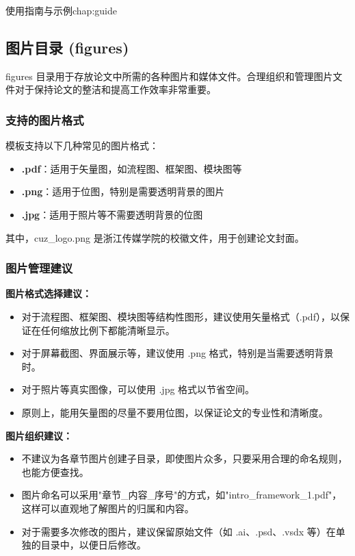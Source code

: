 \begin{cuzchapter}{使用指南与示例}{chap:guide}
    \subsection{图片目录 (figures)}\label{sub:figures}

    figures 目录用于存放论文中所需的各种图片和媒体文件。合理组织和管理图片文件对于保持论文的整洁和提高工作效率非常重要。

    \subsubsection{支持的图片格式}\label{subsub:image-formats}

    模板支持以下几种常见的图片格式：
    \begin{itemize}
        \item \textbf{.pdf}：适用于矢量图，如流程图、框架图、模块图等
        \item \textbf{.png}：适用于位图，特别是需要透明背景的图片
        \item \textbf{.jpg}：适用于照片等不需要透明背景的位图
    \end{itemize}

    其中，cuz\_logo.png 是浙江传媒学院的校徽文件，用于创建论文封面。

    \subsubsection{图片管理建议}\label{subsub:image-management}

    \begin{leftbar}
        \noindent\textbf{图片格式选择建议：}
        \begin{itemize}
            \item 对于流程图、框架图、模块图等结构性图形，建议使用矢量格式（.pdf），以保证在任何缩放比例下都能清晰显示。
            \item 对于屏幕截图、界面展示等，建议使用 .png 格式，特别是当需要透明背景时。
            \item 对于照片等真实图像，可以使用 .jpg 格式以节省空间。
            \item 原则上，能用矢量图的尽量不要用位图，以保证论文的专业性和清晰度。
        \end{itemize}

        \noindent\textbf{图片组织建议：}
        \begin{itemize}
            \item 不建议为各章节图片创建子目录，即使图片众多，只要采用合理的命名规则，也能方便查找。
            \item 图片命名可以采用"章节\_内容\_序号"的方式，如"intro\_framework\_1.pdf"，这样可以直观地了解图片的归属和内容。
            \item 对于需要多次修改的图片，建议保留原始文件（如 .ai、.psd、.vsdx 等）在单独的目录中，以便日后修改。
        \end{itemize}
    \end{leftbar}


\end{cuzchapter}
